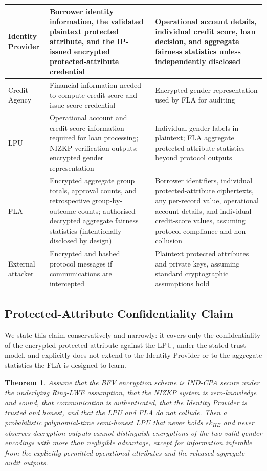 \documentclass[a4paper,fleqn]{cas-dc}
\newtheorem{theorem}{Theorem}
\begin{document}
{\begin{table}[htbp]
\begin{tabular}{|p{2.2cm}|p{6.0cm}|p{6.0cm}|}
Identity Provider
&
Borrower identity information, the validated plaintext protected attribute,
and the IP-issued encrypted protected-attribute credential
&
Operational account details, individual credit score, loan decision, and
aggregate fairness statistics unless independently disclosed
\\
\hline
Credit Agency & Financial information needed to compute credit score and issue score credential & Encrypted gender representation used by FLA for auditing \\
\hline
LPU & Operational account and credit-score information required for loan processing; NIZKP verification outputs; encrypted gender representation & Individual gender labels in plaintext; FLA aggregate protected-attribute statistics beyond protocol outputs \\
\hline
FLA & Encrypted aggregate group totals, approval counts, and retrospective group-by-outcome counts; authorised decrypted aggregate fairness statistics (intentionally disclosed by design) & Borrower identifiers, individual protected-attribute ciphertexts, any per-record value, operational account details, and individual credit-score values, assuming protocol compliance and non-collusion \\
\hline
External attacker & Encrypted and hashed protocol messages if communications are intercepted & Plaintext protected attributes and private keys, assuming standard cryptographic assumptions hold \\
\hline
\end{tabular}
\end{table}

\subsection{Protected-Attribute Confidentiality Claim} \label{subsec:confidentiality_theorem}

We state this claim conservatively and narrowly: it covers only the confidentiality of the encrypted protected attribute against the LPU, under the stated trust model, and explicitly does not extend to the Identity Provider or to the aggregate statistics the FLA is designed to learn.

\begin{theorem} Assume that the BFV encryption scheme is IND-CPA secure under the underlying Ring-LWE assumption, that the NIZKP system is zero-knowledge and sound, that communication is authenticated, that the Identity Provider is trusted and honest, and that the LPU and FLA do not collude. Then a probabilistic polynomial-time semi-honest LPU that never holds $sk_{HE}$ and never observes decryption outputs cannot distinguish encryptions of the two valid gender encodings with more than negligible advantage, except for information inferable from the explicitly permitted operational attributes and the released aggregate audit outputs.
\end{theorem}

}
\end{document}
